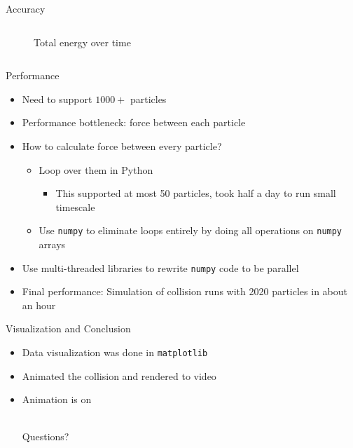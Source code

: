 \documentclass{beamer}
\theoremstyle{definition}
\newcommand{\cmark}{\ding{51}}%
\newcommand{\xmark}{\ding{55}}%
\begin{document}
\begin{frame}{Accuracy}
\begin{columns}[b]
\begin{column}{.5\textwidth}
\begin{figure}
              \caption{Total energy over time}
      \end{figure}
  \end{column}
\end{columns}
\end{frame}

\begin{frame}{Performance}
  \begin{itemize}
    \item Need to support $1000+$ particles
    \item Performance bottleneck: force between each particle
    \item How to calculate force between every particle?
    \begin{itemize}
    \item[\xmark] Loop over them in Python
    \begin{itemize}
      \item This supported at most 50 particles, took half a day to run small timescale
    \end{itemize}
    \item[\cmark] Use \texttt{numpy} to eliminate loops entirely by doing all operations on \texttt{numpy} arrays
  \end{itemize}
  \item Use multi-threaded libraries to rewrite \texttt{numpy} code to be parallel
  \item Final performance: Simulation of collision runs with 2020 particles in about an hour
  \end{itemize}
\end{frame}

\begin{frame}{Visualization and Conclusion}
  \begin{itemize}
    \item Data visualization was done in \texttt{matplotlib}
    \item Animated the collision and rendered to video
    \item Animation is on \href{https://www.youtube.com/watch?v=Qp0M3gj23YY}{}
\\~\\
\begin{center}
\huge Questions?
\end{center}
  \end{itemize}
  
\end{frame}
\end{document}
